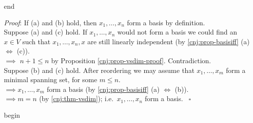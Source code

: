 \documentclass[
  12pt,
  a4paper,
  twoside]{article}
\theoremstyle{plain}
\theoremstyle{definition}
\begin{document}
\csname end

\emph{Proof}:
If (a) and (b) hold, then \(x_1, \dots, x_n\) form a basis by definition.\\
Suppose (a) and (c) hold. If \(x_1, \dots, x_n\) would not form a basis we could find an \(x \in V\) such that \(x_1, \dots, x_n,x\) are still linearly independent (by \ref{cnj:prop-basisiff} (a) \(\iff\) (c)).\\
\(\implies\) \(n+1 \leq n\) by Proposition \ref{cnj:prop-vsdim-proof}. Contradiction.\\
Suppose (b) and (c) hold. After reordering we may assume that \(x_1, \dots, x_m\) form a minimal spanning set, for some \(m \leq n\).\\
\(\implies x_1, \dots, x_m\) form a basis (by \ref{cnj:prop-basisiff} (a) \(\iff\) (b)).\\
\(\implies m=n\) (by \ref{cnj:thm-vsdim}); i.e.~\(x_1, \dots, x_n\) form a basis.
\hfill~{\(\square\)}

\csname begin\label{cnj:expl-vsdim2}
\end{document}

